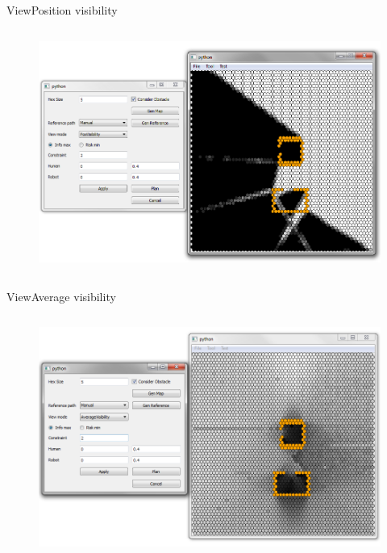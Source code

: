 \begin{frame}{View}{Position visibility}

\begin{columns}
\begin{figure}
\centering
\includegraphics[width = \textwidth]{./screenshot/position_visibility_view2.png}
\end{figure}

\begin{minipage}{\textwidth}
\end{minipage}
\end{columns}

\end{frame}

\begin{frame}{View}{Average visibility}

\begin{columns}
\begin{figure}
\centering
\includegraphics[width = \textwidth]{./screenshot/average_visibility_view.png}
\end{figure}

\begin{minipage}{\textwidth}
\end{minipage}
\end{columns}

\end{frame}

